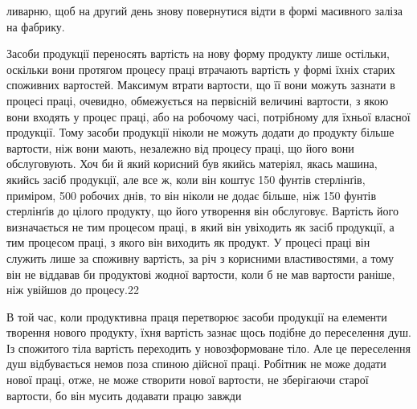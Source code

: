 ливарню, щоб на другий день знову повернутися відти в формі
масивного заліза на фабрику.

Засоби продукції переносять вартість на нову форму продукту
лише остільки, оскільки вони протягом процесу праці втрачають
вартість у формі їхніх старих споживних вартостей. Максимум
втрати вартости, що її вони можуть зазнати в процесі праці, очевидно,
обмежується на первісній величині вартости, з якою вони
входять у процес праці, або на робочому часі, потрібному для
їхньої власної продукції. Тому засоби продукції ніколи не можуть
додати до продукту більше вартости, ніж вони мають, незалежно
від процесу праці, що його вони обслуговують. Хоч би й який
корисний був якийсь матеріял, якась машина, якийсь засіб продукції,
але все ж, коли він коштує 150 фунтів стерлінґів, приміром,
500 робочих днів, то він ніколи не додає більше, ніж 150 фунтів
стерлінґів до цілого продукту, що його утворення він обслуговує.
Вартість його визначається не тим процесом праці, в який
він увіходить як засіб продукції, а тим процесом праці, з якого
він виходить як продукт. У процесі праці він служить лише за
споживну вартість, за річ з корисними властивостями, а тому він
не віддавав би продуктові жодної вартости, коли б не мав вартости
раніше, ніж увійшов до процесу.22

В той час, коли продуктивна праця перетворює засоби продукції
на елементи творення нового продукту, їхня вартість зазнає
щось подібне до переселення душ. Із спожитого тіла вартість
переходить у новозформоване тіло. Але це переселення душ відбувається
немов поза спиною дійсної праці. Робітник не може
додати нової праці, отже, не може створити нової вартости, не
зберігаючи старої вартости, бо він мусить додавати працю завжди

